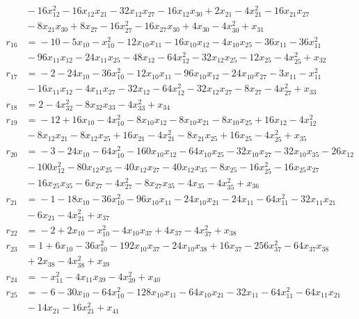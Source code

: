 \begin{align*}
&{}-16x_{12}^{2} -16x_{12}x_{21} -32x_{12}x_{27} -16x_{12}x_{30} +2x_{21} -4x_{21}^{2} -16x_{21}x_{27} \\
&{}-8x_{21}x_{30} +8x_{27} -16x_{27}^{2} -16x_{27}x_{30} +4x_{30} -4x_{30}^{2} +x_{31} \\
r_{16} &={}-10 -5x_{10} -x_{10}^{2} -12x_{10}x_{11} -16x_{10}x_{12} -4x_{10}x_{25} -36x_{11} -36x_{11}^{2} \\
&{}-96x_{11}x_{12} -24x_{11}x_{25} -48x_{12} -64x_{12}^{2} -32x_{12}x_{25} -12x_{25} -4x_{25}^{2} +x_{32} \\
r_{17} &={}-2 -24x_{10} -36x_{10}^{2} -12x_{10}x_{11} -96x_{10}x_{12} -24x_{10}x_{27} -3x_{11} -x_{11}^{2} \\
&{}-16x_{11}x_{12} -4x_{11}x_{27} -32x_{12} -64x_{12}^{2} -32x_{12}x_{27} -8x_{27} -4x_{27}^{2} +x_{33} \\
r_{18} &={}2 -4x_{32}^{2} -8x_{32}x_{33} -4x_{33}^{2} +x_{34} \\
r_{19} &={}-12 +16x_{10} -4x_{10}^{2} -8x_{10}x_{12} -8x_{10}x_{21} -8x_{10}x_{25} +16x_{12} -4x_{12}^{2} \\
&{}-8x_{12}x_{21} -8x_{12}x_{25} +16x_{21} -4x_{21}^{2} -8x_{21}x_{25} +16x_{25} -4x_{25}^{2} +x_{35} \\
r_{20} &={}-3 -24x_{10} -64x_{10}^{2} -160x_{10}x_{12} -64x_{10}x_{25} -32x_{10}x_{27} -32x_{10}x_{35} -26x_{12} \\
&{}-100x_{12}^{2} -80x_{12}x_{25} -40x_{12}x_{27} -40x_{12}x_{35} -8x_{25} -16x_{25}^{2} -16x_{25}x_{27} \\
&{}-16x_{25}x_{35} -6x_{27} -4x_{27}^{2} -8x_{27}x_{35} -4x_{35} -4x_{35}^{2} +x_{36} \\
r_{21} &={}-1 -18x_{10} -36x_{10}^{2} -96x_{10}x_{11} -24x_{10}x_{21} -24x_{11} -64x_{11}^{2} -32x_{11}x_{21} \\
&{}-6x_{21} -4x_{21}^{2} +x_{37} \\
r_{22} &={}-2 +2x_{10} -x_{10}^{2} -4x_{10}x_{37} +4x_{37} -4x_{37}^{2} +x_{38} \\
r_{23} &={}1 +6x_{10} -36x_{10}^{2} -192x_{10}x_{37} -24x_{10}x_{38} +16x_{37} -256x_{37}^{2} -64x_{37}x_{38} \\
&{}+2x_{38} -4x_{38}^{2} +x_{39} \\
r_{24} &={}-x_{11}^{2} -4x_{11}x_{39} -4x_{39}^{2} +x_{40} \\
r_{25} &={}-6 -30x_{10} -64x_{10}^{2} -128x_{10}x_{11} -64x_{10}x_{21} -32x_{11} -64x_{11}^{2} -64x_{11}x_{21} \\
&{}-14x_{21} -16x_{21}^{2} +x_{41} \\

\end{align*}
